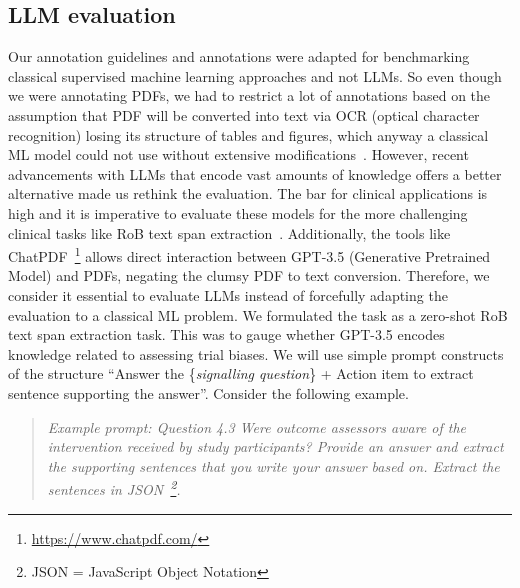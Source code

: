 \documentclass[sn-mathphys,Numbered]{sn-jnl}%
\theoremstyle{thmstyleone}%
\theoremstyle{thmstyletwo}%
\theoremstyle{thmstylethree}%
\begin{document}
\subsection{LLM evaluation}
\label{method:llm}
%
Our annotation guidelines and annotations were adapted for benchmarking classical supervised machine learning approaches and not LLMs.
So even though we were annotating PDFs, we had to restrict a lot of annotations based on the assumption that PDF will be converted into text via OCR (optical character recognition) losing its structure of tables and figures, which anyway a classical ML model could not use without extensive modifications~\cite{li2019figure,li2023uttsr}.
However, recent advancements with LLMs that encode vast amounts of knowledge offers a better alternative made us rethink the evaluation.
The bar for clinical applications is high and it is imperative to evaluate these models for the more challenging clinical tasks like RoB text span extraction~\cite{singhal2023large}.
Additionally, the tools like ChatPDF~\footnote{\url{https://www.chatpdf.com/}} allows direct interaction between GPT-3.5 (Generative Pretrained Model) and PDFs, negating the clumsy PDF to text conversion.
Therefore, we consider it essential to evaluate LLMs instead of forcefully adapting the evaluation to a classical ML problem.
We formulated the task as a zero-shot RoB text span extraction task.
This was to gauge whether GPT-3.5 encodes knowledge related to assessing trial biases.
We will use simple prompt constructs of the structure ``Answer the \{\textit{signalling question}\} + Action item to extract sentence supporting the answer''.
Consider the following example.

\begin{quote}
\itshape Example prompt: Question 4.3 Were outcome assessors aware of the intervention received by study participants? Provide an answer and extract the supporting sentences that you write your answer based on. Extract the sentences in JSON~\footnote{JSON = JavaScript Object Notation}.
\end{quote}
\end{document}
